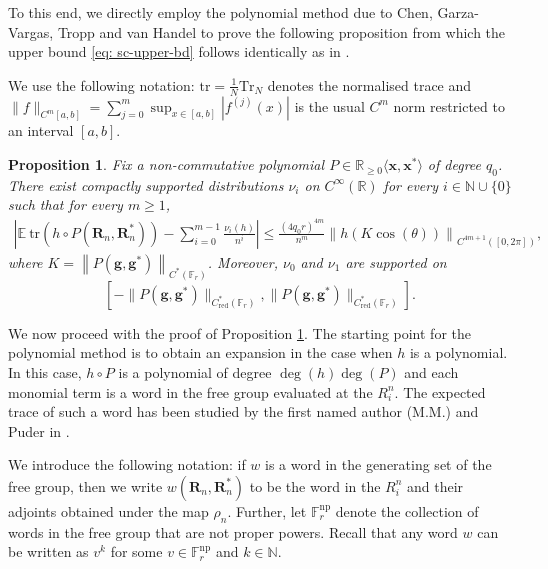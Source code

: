 \documentclass[12pt]{article}
\newtheorem{proposition}[theorem]{Proposition}
\renewcommand{\tr}{\mathrm{tr}}
\renewcommand{\Tr}{\mathrm{Tr}}
\newcommand{\R}{\mathbb{R}}
\newcommand{\N}{\mathbb{N}}
\newcommand{\E}{\mathbb{E}}
\newcommand{\F}{\mathbb{F}}
\newcommand{\1}{\mathds{1}}
\newcommand{\g}{\mathbf{g}}
\newcommand{\rn}{\mathbf{R}_n}
\begin{document}
To this end, we directly employ the polynomial method due to Chen, Garza-Vargas, Tropp and van Handel \cite{chennew} to prove the following proposition from which the upper bound \eqref{eq: sc-upper-bd} follows identically as in \cite[Proof of Thm. 3.9]{chennew}.

We use the following notation: $\tr=\frac{1}{N}\Tr_N$ denotes the normalised trace and $\|f\|_{C^m[a,b]}=\sum_{j=0}^m \sup_{x\in [a,b]}|f^{(j)}(x)|$ is the usual $C^m$ norm restricted to an interval $[a,b]$.

\begin{proposition}
\label{prop:master_ineq}
    Fix a non-commutative polynomial $P\in  \R_{\geq 0}\langle\mathbf{x},\mathbf{x}^*\rangle$ of degree $q_0$. There exist compactly supported distributions $\nu_i$ on $C^\infty(\R)$ for every $i\in\N\cup\{0\}$ such that for every $m\geq 1$,
        \begin{align*}
            \left|\E\ \tr\left(h\circ P\left(\rn,\rn^*\right)\right)-\sum_{i=0}^{m-1}\frac{\nu_i(h)}{n^i}\right| \leq \frac{(4q_0r)^{4m}}{n^m}\left\|h\left(K\cos(\theta)\right)\right\|_{C^{4m+1}([0,2\pi])},
        \end{align*}
    where $K=\left\|P(\g,\g^*)\right\|_{C^*(\F_r)}$. Moreover, $\nu_0$ and $\nu_1$ are supported on
    $$[-\|P(\g,\g^*)\|_{C^*_{\mathrm{red}}(\F_r)},\|P(\g,\g^*)\|_{C^*_{\mathrm{red}}(\F_r)}].$$
\end{proposition}

We now proceed with the proof of Proposition \ref{prop:master_ineq}. The starting point for the polynomial method is to obtain an expansion in the case when $h$ is a polynomial. In this case, $h\circ P$ is a polynomial of degree $\deg(h) \deg(P)$ and each monomial term is a word in the free group evaluated at the $R_i^n$. The expected trace of such a word has been studied by the first named author (M.M.) and Puder in \cite{Ma.Pu2021}. 

We introduce the following notation: if $w$ is a word in the generating set of the free group, then we write $w(\rn,\rn^*)$ to be the word in the $R_i^n$ and their adjoints obtained under the map $\rho_n$. Further, let $\F_r^{\mathrm{np}}$ denote the collection of words in the free group that are not proper powers. Recall that any word $w$ can be written as $v^k$ for some $v\in \F_r^\mathrm{np}$ and $k\in\N$.
\end{document}
